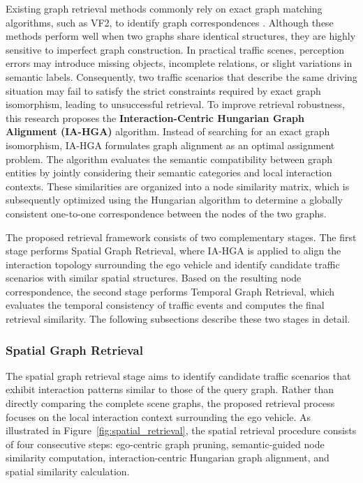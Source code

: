 \documentclass[a4paper, 11pt]{article} %
\begin{document}
Existing graph retrieval methods commonly rely on exact graph matching algorithms, such as VF2, to identify graph correspondences \cite{cordella2004sub,tian2025query}. Although these methods perform well when two graphs share identical structures, they are highly sensitive to imperfect graph construction. In practical traffic scenes, perception errors may introduce missing objects, incomplete relations, or slight variations in semantic labels. Consequently, two traffic scenarios that describe the same driving situation may fail to satisfy the strict constraints required by exact graph isomorphism, leading to unsuccessful retrieval. To improve retrieval robustness, this research proposes the \textbf{Interaction-Centric Hungarian Graph Alignment (IA-HGA)} algorithm. Instead of searching for an exact graph isomorphism, IA-HGA formulates graph alignment as an optimal assignment problem. The algorithm evaluates the semantic compatibility between graph entities by jointly considering their semantic categories and local interaction contexts. These similarities are organized into a node similarity matrix, which is subsequently optimized using the Hungarian algorithm to determine a globally consistent one-to-one correspondence between the nodes of the two graphs.




The proposed retrieval framework consists of two complementary stages. The first stage performs Spatial Graph Retrieval, where IA-HGA is applied to align the interaction topology surrounding the ego vehicle and identify candidate traffic scenarios with similar spatial structures. Based on the resulting node correspondence, the second stage performs Temporal Graph Retrieval, which evaluates the temporal consistency of traffic events and computes the final retrieval similarity. The following subsections describe these two stages in detail.
\subsubsection{Spatial Graph Retrieval}

The spatial graph retrieval stage aims to identify candidate traffic scenarios that exhibit interaction patterns similar to those of the query graph. Rather than directly comparing the complete scene graphs, the proposed retrieval process focuses on the local interaction context surrounding the ego vehicle. As illustrated in Figure~\ref{fig:spatial_retrieval}, the spatial retrieval procedure consists of four consecutive steps: ego-centric graph pruning, semantic-guided node similarity computation, interaction-centric Hungarian graph alignment, and spatial similarity calculation.
\end{document}

